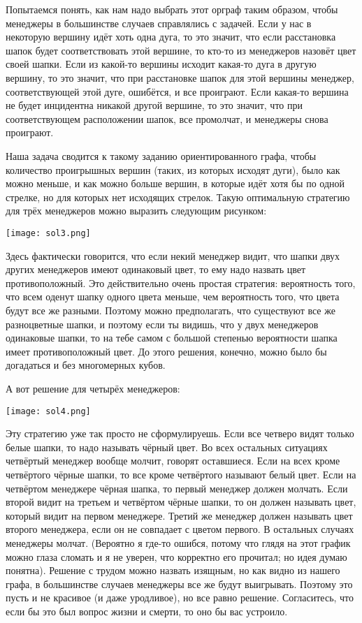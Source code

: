 Попытаемся понять, как нам надо выбрать этот орграф таким образом, чтобы менеджеры в большинстве случаев справлялись с задачей. Если у нас в некоторую вершину идёт хоть одна дуга, то это значит, что если расстановка шапок будет соответствовать этой вершине, то кто-то из менеджеров назовёт цвет своей шапки. Если из какой-то вершины исходит какая-то дуга в другую вершину, то это значит, что при расстановке шапок для этой вершины менеджер, соответствующей этой дуге, ошибётся, и все проиграют. Если какая-то вершина не будет инцидентна никакой другой вершине, то это значит, что при соответствующем расположении шапок, все промолчат, и менеджеры снова проиграют.

Наша задача сводится к такому заданию ориентированного графа, чтобы количество проигрышных вершин (таких, из которых исходят дуги), было как можно меньше, и как можно больше вершин, в которые идёт хотя бы по одной стрелке, но для которых нет исходящих стрелок. Такую оптимальную стратегию для трёх менеджеров можно выразить следующим рисунком:

\texttt{[image: sol3.png]}

Здесь фактически говорится, что если некий менеджер видит, что шапки двух других менеджеров имеют одинаковый цвет, то ему надо назвать цвет противоположный. Это действительно очень простая стратегия: вероятность того, что всем оденут шапку одного цвета меньше, чем вероятность того, что цвета будут все же разными. Поэтому можно предполагать, что существуют все же разноцветные шапки, и поэтому если ты видишь, что у двух менеджеров одинаковые шапки, то на тебе самом с большой степенью вероятности шапка имеет противоположный цвет. До этого решения, конечно, можно было бы догадаться и без многомерных кубов.

А вот решение для четырёх менеджеров:

\texttt{[image: sol4.png]}

Эту стратегию уже так просто не сформулируешь. Если все четверо видят только белые шапки, то надо называть чёрный цвет. Во всех остальных ситуациях четвёртый менеджер вообще молчит, говорят оставшиеся. Если на всех кроме четвёртого чёрные шапки, то все кроме четвёртого называют белый цвет. Если на четвёртом менеджере чёрная шапка, то первый менеджер должен молчать. Если второй видит на третьем и четвёртом чёрные шапки, то он должен называть цвет, который видит на первом менеджере. Третий же менеджер должен называть цвет второго менеджера, если он не совпадает с цветом первого. В остальных случаях менеджеры молчат. (Вероятно я где-то ошибся, потому что глядя на этот график можно глаза сломать и я не уверен, что корректно его прочитал; но идея думаю понятна). Решение с трудом можно назвать изящным, но как видно из нашего графа, в большинстве случаев менеджеры все же будут выигрывать. Поэтому это пусть и не красивое (и даже уродливое), но все равно решение. Согласитесь, что если бы это был вопрос жизни и смерти, то оно бы вас устроило.

